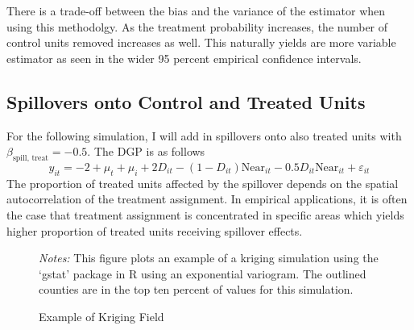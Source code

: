 \documentclass[11pt]{article}
\begin{document}
There is a trade-off between the bias and the variance of the estimator when using this methodolgy. As the treatment probability increases, the number of control units removed increases as well. This naturally yields are more variable estimator as seen in the wider 95 percent empirical confidence intervals. 


\subsection{Spillovers onto Control and Treated Units}

For the following simulation, I will add in spillovers onto also treated units with $\beta_{\text{spill, treat}} = -0.5$. The DGP is as follows 
\begin{equation}
    \label{dgp2} 
    y_{it} = -2 + \mu_t + \mu_i + 2 D_{it} - (1-D_{it}) \text{Near}_{it} - 0.5 D_{it} \text{Near}_{it} + \varepsilon_{it}   
\end{equation} 
The proportion of treated units affected by the spillover depends on the spatial autocorrelation of the treatment assignment. In empirical applications, it is often the case that treatment assignment is concentrated in specific areas which yields higher proportion of treated units receiving spillover effects.

\begin{figure}[t]
    \caption{Example of Kriging Field}
    \label{fig:kriging}
    {\centering
    }
    {\footnotesize
        \textit{Notes:} This figure plots an example of a kriging simulation using the `gstat' package in R using an exponential variogram. The outlined counties are in the top ten percent of values for this simulation. 
    }
\end{figure}
\end{document}
